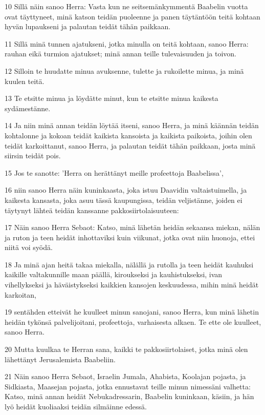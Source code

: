 \par 10 Sillä näin sanoo Herra: Vasta kun ne seitsemänkymmentä Baabelin vuotta ovat täyttyneet, minä katson teidän puoleenne ja panen täytäntöön teitä kohtaan hyvän lupaukseni ja palautan teidät tähän paikkaan.
\par 11 Sillä minä tunnen ajatukseni, jotka minulla on teitä kohtaan, sanoo Herra: rauhan eikä turmion ajatukset; minä annan teille tulevaisuuden ja toivon.
\par 12 Silloin te huudatte minua avuksenne, tulette ja rukoilette minua, ja minä kuulen teitä.
\par 13 Te etsitte minua ja löydätte minut, kun te etsitte minua kaikesta sydämestänne.
\par 14 Ja niin minä annan teidän löytää itseni, sanoo Herra, ja minä käännän teidän kohtalonne ja kokoan teidät kaikista kansoista ja kaikista paikoista, joihin olen teidät karkoittanut, sanoo Herra, ja palautan teidät tähän paikkaan, josta minä siirsin teidät pois.
\par 15 Jos te sanotte: 'Herra on herättänyt meille profeettoja Baabelissa',
\par 16 niin sanoo Herra näin kuninkaasta, joka istuu Daavidin valtaistuimella, ja kaikesta kansasta, joka asuu tässä kaupungissa, teidän veljistänne, joiden ei täytynyt lähteä teidän kanssanne pakkosiirtolaisuuteen:
\par 17 Näin sanoo Herra Sebaot: Katso, minä lähetän heidän sekaansa miekan, nälän ja ruton ja teen heidät inhottaviksi kuin viikunat, jotka ovat niin huonoja, ettei niitä voi syödä.
\par 18 Ja minä ajan heitä takaa miekalla, nälällä ja rutolla ja teen heidät kauhuksi kaikille valtakunnille maan päällä, kiroukseksi ja kauhistukseksi, ivan vihellykseksi ja häväistykseksi kaikkien kansojen keskuudessa, mihin minä heidät karkoitan,
\par 19 sentähden etteivät he kuulleet minun sanojani, sanoo Herra, kun minä lähetin heidän tykönsä palvelijoitani, profeettoja, varhaisesta alkaen. Te ette ole kuulleet, sanoo Herra.
\par 20 Mutta kuulkaa te Herran sana, kaikki te pakkosiirtolaiset, jotka minä olen lähettänyt Jerusalemista Baabeliin.
\par 21 Näin sanoo Herra Sebaot, Israelin Jumala, Ahabista, Koolajan pojasta, ja Sidkiasta, Maasejan pojasta, jotka ennustavat teille minun nimessäni valhetta: Katso, minä annan heidät Nebukadressarin, Baabelin kuninkaan, käsiin, ja hän lyö heidät kuoliaaksi teidän silmäinne edessä.
